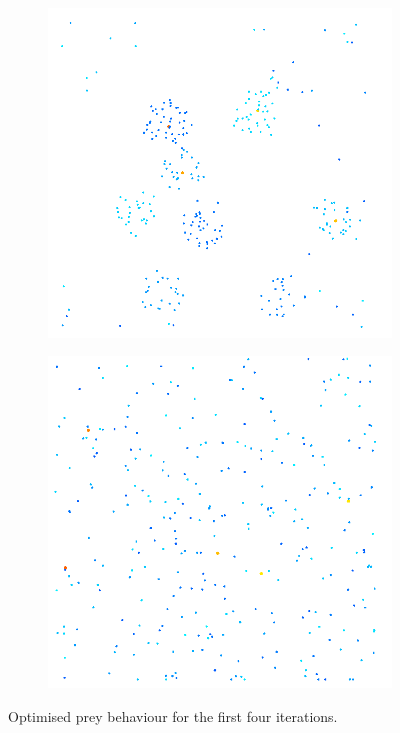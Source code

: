 \documentclass[12pt]{article}
\begin{document}
\begin{figure}[h]
\begin{subfigure}{0.4\textwidth}
        \label{fig:old2}
    \end{subfigure}
    \begin{subfigure}{0.4\textwidth}
        \includegraphics[width=\linewidth]{fig/old3.png}
        \label{fig:old3}
    \end{subfigure}
    \begin{subfigure}{0.4\textwidth}
        \includegraphics[width=\linewidth]{fig/old4.png}
        \label{fig:old4}
        \end{subfigure}
    \caption{Optimised prey behaviour for the first four iterations.}
    \label{fig:old}
\end{figure}
\end{document}
